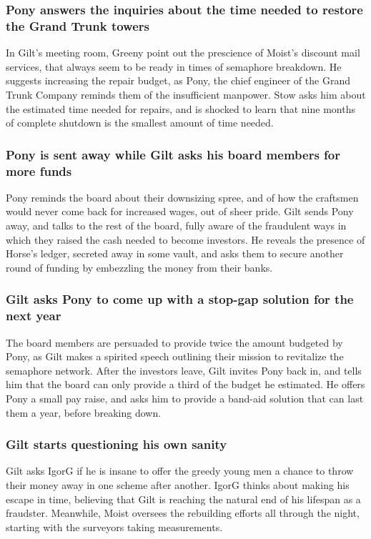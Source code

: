 \subsubsection{\Gls{Pony} answers the inquiries about the time needed to restore the Grand Trunk
    towers}
In \Gls{Gilt}'s meeting room, \Gls{Greeny} point out the prescience of \Gls{Moist}'s discount mail
services, that always seem to be ready in times of semaphore breakdown. He suggests increasing the
repair budget, as \Gls{Pony}, the chief engineer of the Grand Trunk Company reminds them of the
insufficient manpower. \Gls{Stow} asks him about the estimated time needed for repairs, and is
shocked to learn that nine months of complete shutdown is the smallest amount of time needed.

\subsubsection{\Gls{Pony} is sent away while \Gls{Gilt} asks his board members for more funds}
\Gls{Pony} reminds the board about their downsizing spree, and of how the craftsmen would never
come back for increased wages, out of sheer pride. \Gls{Gilt} sends \Gls{Pony} away, and talks to
the rest of the board, fully aware of the fraudulent ways in which they raised the cash needed to
become investors. He reveals the presence of \Gls{Horse}'s ledger, secreted away in some vault, and
asks them to secure another round of funding by embezzling the money from their banks.

\subsubsection{\Gls{Gilt} asks \Gls{Pony} to come up with a stop-gap solution for the next year}
The board members are persuaded to provide twice the amount budgeted by \Gls{Pony}, as \Gls{Gilt}
makes a spirited speech outlining their mission to revitalize the semaphore network. After the
investors leave, \Gls{Gilt} invites \Gls{Pony} back in, and tells him that the board can only
provide a third of the budget he estimated. He offers \Gls{Pony} a small pay raise, and asks him to
provide a band-aid solution that can last them a year, before breaking down.

\subsubsection{\Gls{Gilt} starts questioning his own sanity}
\Gls{Gilt} asks \Gls{IgorG} if he is insane to offer the greedy young men a chance to throw their
money away in one scheme after another. \Gls{IgorG} thinks about making his escape in time,
believing that \Gls{Gilt} is reaching the natural end of his lifespan as a fraudster. Meanwhile,
\Gls{Moist} oversees the rebuilding efforts all through the night, starting with the surveyors
taking measurements.

